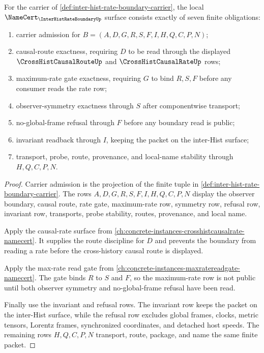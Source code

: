\begin{theorem}
\label{thm:inter-hist-rate-boundary-namecert-obligations}
For the carrier of \autoref{def:inter-hist-rate-boundary-carrier}, the local $\NameCert_{\InterHistRateBoundaryUp}$ surface consists exactly of seven finite obligations:
\begin{enumerate}
\item carrier admission for $B=(A,D,G,R,S,F,I,H,Q,C,P,N)$;
\item causal-route exactness, requiring $D$ to be read through the displayed $\CrossHistCausalRouteUp$ and $\CrossHistCausalRateUp$ rows;
\item maximum-rate gate exactness, requiring $G$ to bind $R,S,F$ before any consumer reads the rate row;
\item observer-symmetry exactness through $S$ after componentwise transport;
\item no-global-frame refusal through $F$ before any boundary read is public;
\item invariant readback through $I$, keeping the packet on the inter-Hist surface;
\item transport, probe, route, provenance, and local-name stability through $H,Q,C,P,N$.
\end{enumerate}
\end{theorem}
\begin{proof}
Carrier admission is the projection of the finite tuple in \autoref{def:inter-hist-rate-boundary-carrier}. The rows $A,D,G,R,S,F,I,H,Q,C,P,N$ display the observer boundary, causal route, rate gate, maximum-rate row, symmetry row, refusal row, invariant row, transports, probe stability, routes, provenance, and local name.

Apply the causal-rate surface from \autoref{ch:concrete-instances-crosshistcausalrate-namecert}. It supplies the route discipline for $D$ and prevents the boundary from reading a rate before the cross-history causal route is displayed.

Apply the max-rate read gate from \autoref{ch:concrete-instances-maxratereadgate-namecert}. The gate binds $R$ to $S$ and $F$, so the maximum-rate row is not public until both observer symmetry and no-global-frame refusal have been read.

Finally use the invariant and refusal rows. The invariant row keeps the packet on the inter-Hist surface, while the refusal row excludes global frames, clocks, metric tensors, Lorentz frames, synchronized coordinates, and detached host speeds. The remaining rows $H,Q,C,P,N$ transport, route, package, and name the same finite packet.
\end{proof}

